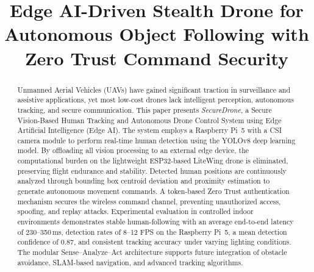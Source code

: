\documentclass[conference]{IEEEtran}
\begin{document}
\title{Edge AI-Driven Stealth Drone for Autonomous Object Following with Zero Trust Command Security}

\author{
\and
{}
\and
{}
}

\maketitle

\begin{abstract}
Unmanned Aerial Vehicles (UAVs) have gained significant traction in surveillance and assistive applications, yet most low-cost drones lack intelligent perception, autonomous tracking, and secure communication. This paper presents \textit{SecureDrone}, a Secure Vision-Based Human Tracking and Autonomous Drone Control System using Edge Artificial Intelligence (Edge AI). The system employs a Raspberry Pi~5 with a CSI camera module to perform real-time human detection using the YOLOv8 deep learning model. By offloading all vision processing to an external edge device, the computational burden on the lightweight ESP32-based LiteWing drone is eliminated, preserving flight endurance and stability. Detected human positions are continuously analyzed through bounding box centroid deviation and proximity estimation to generate autonomous movement commands. A token-based Zero Trust authentication mechanism secures the wireless command channel, preventing unauthorized access, spoofing, and replay attacks. Experimental evaluation in controlled indoor environments demonstrates stable human-following with an average end-to-end latency of 230--350\,ms, detection rates of 8--12 FPS on the Raspberry Pi~5, a mean detection confidence of 0.87, and consistent tracking accuracy under varying lighting conditions. The modular Sense--Analyze--Act architecture supports future integration of obstacle avoidance, SLAM-based navigation, and advanced tracking algorithms.
\end{abstract}
\end{document}
